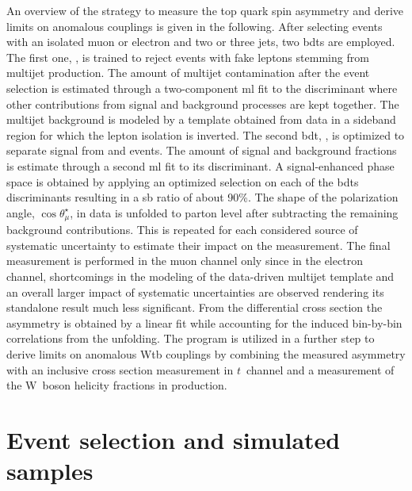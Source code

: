 An overview of the strategy to measure the top quark spin asymmetry and derive limits on anomalous couplings is given in the following. After selecting events with an isolated muon or electron and two or three jets, two \glspl{bdt} are employed. The first one, \bdtqcd, is trained to reject events with fake leptons stemming from multijet production. The amount of multijet contamination after the event selection is estimated through a two-component \gls{ml} fit to the \bdtqcd discriminant where other contributions from signal and background processes are kept together. The multijet background is modeled by a template obtained from data in a sideband region for which the lepton isolation is inverted. The second \gls{bdt}, \bdttch, is optimized to separate signal from \wjets and \ttbar events. The amount of signal and background fractions is estimate through a second \gls{ml} fit to its discriminant. A signal-enhanced phase space is obtained by applying an optimized selection on each of the \glspl{bdt} discriminants resulting in a \gls{sb} ratio of about 90\%. The shape of the polarization angle, $\cos\theta^\star_{\mu}$, in data is unfolded to parton level after subtracting the remaining background contributions. This is repeated for each considered source of systematic uncertainty to estimate their impact on the measurement. The final measurement is performed in the muon channel only since in the electron channel, shortcomings in the modeling of the data-driven multijet template and an overall larger impact of systematic uncertainties are observed rendering its standalone result much less significant. From the differential cross section the asymmetry is obtained by a linear fit while accounting for the induced bin-by-bin correlations from the unfolding. The \TOPFIT program is utilized in a further step to derive limits on anomalous Wtb couplings by combining the measured asymmetry with an inclusive cross section measurement in $t$~channel and a measurement of the W~boson helicity fractions in \ttbar production.




\section{Event selection and simulated samples}

